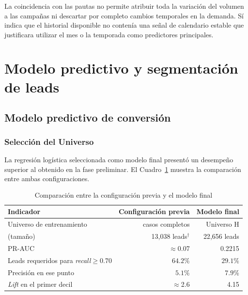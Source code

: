 La coincidencia con las pautas no permite atribuir toda la variación del volumen a las campañas ni descartar por completo cambios temporales en la demanda. Sí indica que el historial disponible no contenía una señal de calendario estable que justificara utilizar el mes o la temporada como predictores principales. 

\section{Modelo predictivo y segmentación de leads}
\label{sec:res-modelado}

\subsection{Modelo predictivo de conversión}

\subsubsection{Selección del Universo}

La regresión logística seleccionada como modelo final presentó un desempeño superior al obtenido en la fase preliminar. El Cuadro~\ref{cuad:comparacion-fases} muestra la comparación entre ambas configuraciones.

\begin{table}[H]
\centering
\caption{Comparación entre la configuración previa y el modelo final}
\label{cuad:comparacion-fases}
\begin{tabular}{lrr}
\hline
\textbf{Indicador} & \textbf{Configuración previa} & \textbf{Modelo final} \\
\hline
Universo de entrenamiento                & casos completos & Universo H \\
\quad (tamaño)                           & 13{,}038 leads$^{\dagger}$ & 22{,}656 leads \\
PR-AUC                                   & $\approx$0.07  & 0.2215 \\
Leads requeridos para \emph{recall}$\geq$0.70 & $64.2\%$       & $29.1\%$ \\
Precisión en ese punto                   & $5.1\%$        & $7.9\%$ \\
\emph{Lift} en el primer decil           & $\approx$2.6   & 4.15 \\
\hline
\end{tabular}
\fuentepropia
\end{table}

